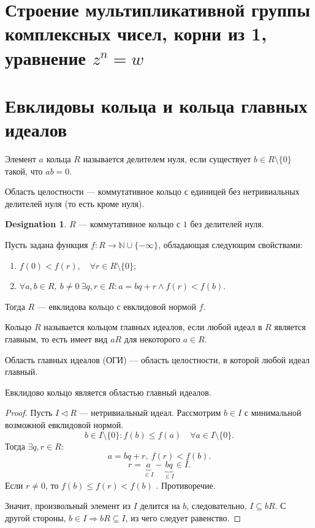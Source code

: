 \documentclass[11pt]{book}
\newcommand{\N}{\mathbb{N}}
\renewcommand{\le}{\leqslant}
\theoremstyle{definition}
\theoremstyle{plain}
\theoremstyle{plain}
\theoremstyle{definition}
\newtheorem*{name}{Designation}
\theoremstyle{remark}
\begin{document}
\section{Строение мультипликативной группы комплексных чисел, корни из 1, уравнение $ z^{n} = w$}
\section{Евклидовы кольца и кольца главных идеалов}
\begin{defn}
    Элемент $ a $ кольца $ R$ называется {\sf делителем  нуля}, если существует  $ b \in R \setminus \{0\}$ такой, что $ ab = 0$.

    {\sf Область целостности} --- коммутативное кольцо с единицей без  нетривиальных делителей нуля (то есть кроме нуля).   
\end{defn}
\begin{name}
    $ R$ --- коммутативное кольцо с $ 1$ без делителей нуля.
\end{name}
\begin{defn}
    Пусть задана функция $ f: R \to  \N \cup \{-\infty\}$, обладающая следующим свойствами: 
    \begin{enumerate}[noitemsep]
	\item $ f(0) < f(r), \quad \forall  r \in  R \setminus \{0\}$;
	\item $ \forall a, b \in  R, ~b\ne 0 ~ \exists  q, r \in R: a = b q + r \wedge f(r) < f(b)$.
    \end{enumerate}
    Тогда $ R$ --- {\sf евклидова кольцо с евклидовой нормой  $ f$}.
\end{defn}
\begin{defn}
    Кольцо $ R$ называется {\sf  кольцом главных идеалов}, если любой идеал в  $ R$ является главным, то есть имеет вид  $ aR$ для некоторого  $ a \in R$.

    {\sf Область главных идеалов (ОГИ)} --- область целостности, в которой любой идеал главный.
\end{defn}
\begin{thm}
    Евклидово кольцо является областью главный идеалов.
\end{thm}
\begin{proof}
    Пусть  $ I \triangleleft  R$ --- нетривиальный идеал. 
    Рассмотрим $ b \in I$ с минимальной возможной евклидовой нормой.
    \[
	b \in  I \setminus \{0\}: f(b) \le  f(a) \quad \forall  a \in  I \setminus \{0\}
    .\] 
    Тогда $ \exists q, r \in R$:
    \[
	a = b q + r , ~ f(r) < f(b)
    .\] 
    \[
	r = \underbrace{a}_{\in I} - \underbrace{bq}_{ \in  I} \in  I 
    .\] 
    Если $r \ne 0$, то $ f(b) \le  f(r) < f(b)$ . Противоречие. 

    Значит, произвольный элемент из $ I$ делится на  $ b$, следовательно,  $ I \subseteq bR$. С другой стороны, $ b \in I \Longrightarrow bR \subseteq I$, из чего следует равенство. 
\end{proof}
\end{document}

